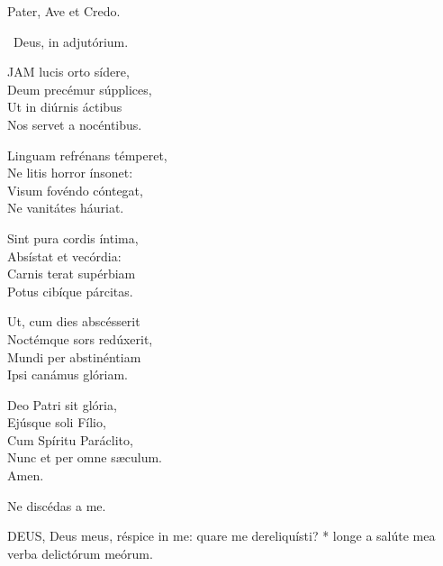 

Pater, Ave et Credo.

\V\ Deus, in adjutórium.


\lettrine[lines=2]{J}{AM} lucis orto sídere,\\
Deum precémur súpplices,\\
Ut in diúrnis áctibus\\
Nos servet a nocéntibus.

Linguam refrénans témperet,\\
Ne litis horror ínsonet:\\
Visum fovéndo cóntegat,\\
Ne vanitátes háuriat.

Sint pura cordis íntima,\\
Absístat et vecórdia:\\
Carnis terat supérbiam\\
Potus cibíque párcitas.

Ut, cum dies abscésserit\\
Noctémque sors redúxerit,\\
Mundi per abstinéntiam\\
Ipsi canámus glóriam.

Deo Patri sit glória,\\
Ejúsque soli Fílio,\\
Cum Spíritu Paráclito,\\
Nunc et per omne sæculum.\\
Amen.

 Ne discédas a me.


\lettrine[lines=2]{D}{EUS}, Deus meus, réspice in me: quare me dereliquísti? * longe a salúte mea verba delictórum meórum.

